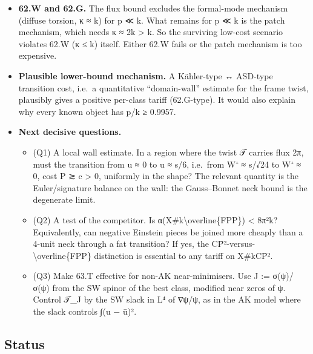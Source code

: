 \documentclass[
  10pt,
]{report}
\providecommand{\tightlist}{%
  \setlength{\itemsep}{0pt}\setlength{\parskip}{0pt}}
\begin{document}
\begin{itemize}
\tightlist
\item
  \textbf{62.W and 62.G.} The flux bound excludes the formal-mode
  mechanism (diffuse torsion, κ ≈ k) for p ≪ k. What remains for p ≪ k
  is the patch mechanism, which needs κ ≈ 2k \textgreater{} k. So the
  surviving low-cost scenario violates 62.W (κ ≤ k) itself. Either 62.W
  fails or the patch mechanism is too expensive.
\item
  \textbf{Plausible lower-bound mechanism.} A Kähler-type ↔ ASD-type
  transition cost, i.e.~a quantitative ``domain-wall'' estimate for the
  frame twist, plausibly gives a positive per-class tariff (62.G-type).
  It would also explain why every known object has p/k ≥ 0.9957.
\item
  \textbf{Next decisive questions.}

  \begin{itemize}
  \tightlist
  \item
    (Q1) A local wall estimate. In a region where the twist 𝒯 carries
    flux 2π, must the transition from u ≈ 0 to u ≈ \textbar s\textbar/6,
    i.e.~from \textbar W⁺\textbar{} ≈ \textbar s\textbar/√24 to W⁺ ≈ 0,
    cost P ≳ c \textgreater{} 0, uniformly in the shape? The relevant
    quantity is the Euler/signature balance on the wall: the
    Gauss--Bonnet neck bound is the degenerate limit.
  \item
    (Q2) A test of the competitor. Is
    α(X\#k\textbackslash overline\{FPP\}) \textless{} 8π²k?
    Equivalently, can negative Einstein pieces be joined more cheaply
    than a 4-unit neck through a fat transition? If yes, the
    CP̄²-versus-\textbackslash overline\{FPP\} distinction is essential
    to any tariff on X\#kCP̄².
  \item
    (Q3) Make 63.T effective for non-AK near-minimisers. Use J :=
    σ(ψ)/\textbar σ(ψ)\textbar{} from the SW spinor of the best class,
    modified near zeros of ψ. Control 𝒯\_J by the SW slack in L⁴ of
    ∇ψ/\textbar ψ\textbar, as in the AK model where the slack controls
    ∫(u − ū)².
  \end{itemize}
\end{itemize}

\hypertarget{status-1}{%
\subsection{Status}\label{status-1}}
\end{document}
